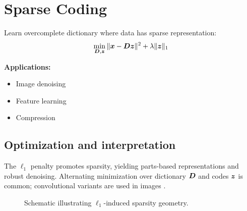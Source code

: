 
\section{Sparse Coding }
\label{sec:sparse-coding}

Learn overcomplete dictionary where data has sparse representation:
\begin{equation}
\min_{\boldsymbol{D}, \boldsymbol{z}} \|\boldsymbol{x} - \boldsymbol{D}\boldsymbol{z}\|^2 + \lambda \|\boldsymbol{z}\|_1
\end{equation}

\textbf{Applications:}
\begin{itemize}
    \item Image denoising
    \item Feature learning
    \item Compression
\end{itemize}

\subsection{Optimization and interpretation}

The $\ell_1$ penalty promotes sparsity, yielding parts-based representations and robust denoising. Alternating minimization over dictionary $\boldsymbol{D}$ and codes $\boldsymbol{z}$ is common; convolutional variants are used in images \textcite{GoodfellowEtAl2016}.

\begin{figure}[h]
  \centering
  \caption{Schematic illustrating $\ell_1$-induced sparsity geometry.}
  \label{fig:l1-geometry}
\end{figure}
